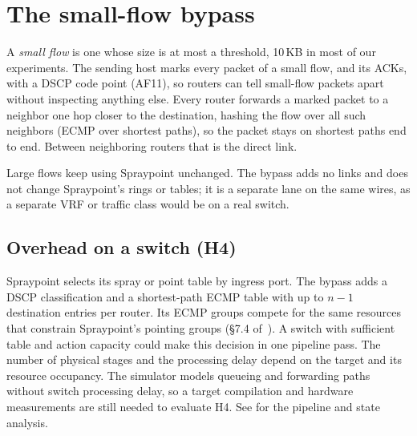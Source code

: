 \section{The small-flow bypass}
\label{sec:bypass}

A \emph{small flow} is one whose size is at most a threshold, 10\,KB in most of our experiments. The sending host marks every packet of a small flow, and its ACKs, with a DSCP code point (AF11), so routers can tell small-flow packets apart without inspecting anything else. Every router forwards a marked packet to a neighbor one hop closer to the destination, hashing the flow over all such neighbors (ECMP over shortest paths), so the packet stays on shortest paths end to end. Between neighboring routers that is the direct link.

Large flows keep using Spraypoint unchanged. The bypass adds no links and does not change Spraypoint's rings or tables; it is a separate lane on the same wires, as a separate VRF or traffic class would be on a real switch.

\subsection{Overhead on a switch (H4)}
\label{sec:h4}

Spraypoint selects its spray or point table by ingress port. The bypass adds a DSCP classification and a shortest-path ECMP table with up to $n-1$ destination entries per router. Its ECMP groups compete for the same resources that constrain Spraypoint's pointing groups (§7.4 of~\cite{rng}). A switch with sufficient table and action capacity could make this decision in one pipeline pass. The number of physical stages and the processing delay depend on the target and its resource occupancy. The simulator models queueing and forwarding paths without switch processing delay, so a target compilation and hardware measurements are still needed to evaluate H4. See  for the pipeline and state analysis.
